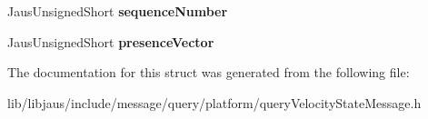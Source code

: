 \begin{DoxyCompactItemize}
\item 
\hypertarget{struct_query_velocity_state_message_struct_af4695fd4f8303503c70397bb7eb36fbc}{\-Jaus\-Unsigned\-Short {\bfseries sequence\-Number}}\label{struct_query_velocity_state_message_struct_af4695fd4f8303503c70397bb7eb36fbc}

\item 
\hypertarget{struct_query_velocity_state_message_struct_a392d4e4f00ba2ec73bb6e9903b8aa708}{\-Jaus\-Unsigned\-Short {\bfseries presence\-Vector}}\label{struct_query_velocity_state_message_struct_a392d4e4f00ba2ec73bb6e9903b8aa708}

\end{DoxyCompactItemize}


\-The documentation for this struct was generated from the following file\-:\begin{DoxyCompactItemize}
\item 
lib/libjaus/include/message/query/platform/query\-Velocity\-State\-Message.\-h\end{DoxyCompactItemize}
